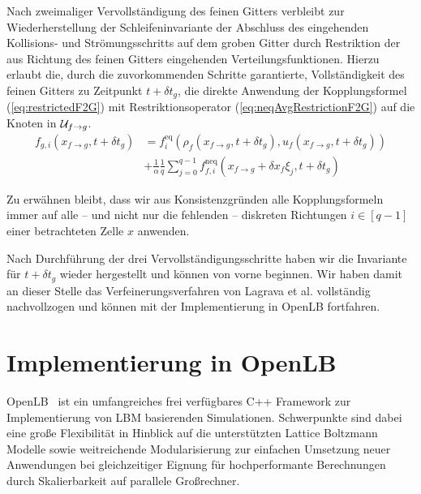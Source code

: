\begin{description}[style=unboxed,leftmargin=0cm]
\item[Vervollständigung von \(\G\) zu Zeitpunkt \(t+\delta t_g\):] Nach zweimaliger Vervollständigung des feinen Gitters verbleibt zur Wiederherstellung der Schleifeninvariante der Abschluss des eingehenden Kollisions- und Strömungsschritts auf dem groben Gitter durch Restriktion der aus Richtung des feinen Gitters eingehenden Verteilungsfunktionen. Hierzu erlaubt die, durch die zuvorkommenden Schritte garantierte, Vollständigkeit des feinen Gitters zu Zeitpunkt \(t+\delta t_g\), die direkte Anwendung der Kopplungsformel (\ref{eq:restrictedF2G}) mit Restriktionsoperator (\ref{eq:neqAvgRestrictionF2G}) auf die Knoten in \(\mathcal{U}_{f \to g}\).
\begin{align*}
f_{g,i}(x_{f \to g},t+\delta t_g) &= f_i^\text{eq}(\rho_f(x_{f \to g},t+\delta t_g), u_f(x_{f \to g},t+\delta t_g))\\
&+ \frac{1}{\alpha} \frac{1}{q} \sum_{j=0}^{q-1} f_{f,i}^\text{neq}(x_{f \to g} + \delta x_f \xi_j,t+\delta t_g)
\end{align*}
\end{description}
Zu erwähnen bleibt, dass wir aus Konsistenzgründen alle Kopplungsformeln immer auf alle -- und nicht nur die fehlenden -- diskreten Richtungen \(i \in [q-1]\) einer betrachteten Zelle \(x\) anwenden.

\bigskip
Nach Durchführung der drei Vervollständigungsschritte haben wir die Invariante für \(t+\delta t_g\) wieder hergestellt und können von vorne beginnen. Wir haben damit an dieser Stelle das Verfeinerungsverfahren von Lagrava et al. vollständig nachvollzogen und können mit der Implementierung in OpenLB fortfahren.


\newpage
\section{Implementierung in OpenLB}

OpenLB~\cite{olb12} ist ein umfangreiches frei verfügbares C++ Framework zur Implementierung von LBM basierenden Simulationen. Schwerpunkte sind dabei eine große Flexibilität in Hinblick auf die unterstützten Lattice Boltzmann Modelle sowie weitreichende Modularisierung zur einfachen Umsetzung neuer Anwendungen bei gleichzeitiger Eignung für hochperformante Berechnungen durch Skalierbarkeit auf parallele Großrechner.

